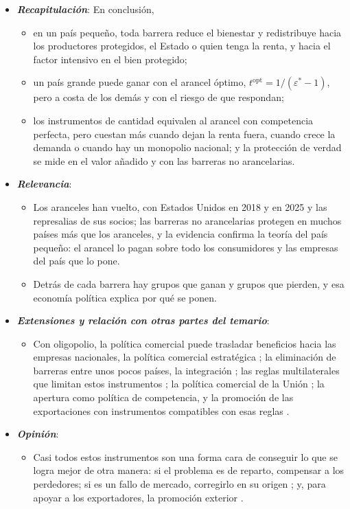 \documentclass[11pt]{article}
\begin{document}
\begin{itemize}
\item \textbf{\emph{Recapitulación}}: En conclusión,
  \begin{itemize}
  \item en un país pequeño, toda barrera reduce el bienestar y redistribuye hacia los productores protegidos, el Estado o quien tenga la renta, y hacia el factor intensivo en el bien protegido;
  \item un país grande puede ganar con el arancel óptimo, $t^{\mathrm{opt}}=1/(\varepsilon^*-1)$, pero a costa de los demás y con el riesgo de que respondan;
  \item los instrumentos de cantidad equivalen al arancel con competencia perfecta, pero cuestan más cuando dejan la renta fuera, cuando crece la demanda o cuando hay un monopolio nacional; y la protección de verdad se mide en el valor añadido y con las barreras no arancelarias.
  \end{itemize}
\item \textbf{\emph{Relevancia}}:
  \begin{itemize}
  \item Los aranceles han vuelto, con Estados Unidos en 2018 y en 2025 y las represalias de sus socios; las barreras no arancelarias protegen en muchos países más que los aranceles, y la evidencia confirma la teoría del país pequeño: el arancel lo pagan sobre todo los consumidores y las empresas del país que lo pone.

  \item Detrás de cada barrera hay grupos que ganan y grupos que pierden, y esa economía política explica por qué se ponen.
  \end{itemize}
\item \textbf{\emph{Extensiones y relación con otras partes del temario}}:
  \begin{itemize}
  \item Con oligopolio, la política comercial puede trasladar beneficios hacia las empresas nacionales, la política comercial estratégica ; la eliminación de barreras entre unos pocos países, la integración ; las reglas multilaterales que limitan estos instrumentos ; la política comercial de la Unión ; la apertura como política de competencia\nocite{CNMC2017Beneficios}, y la promoción de las exportaciones con instrumentos compatibles con esas reglas .
  \end{itemize}
\item \textbf{\emph{Opinión}}:
  \begin{itemize}
  \item Casi todos estos instrumentos son una forma cara de conseguir lo que se logra mejor de otra manera: si el problema es de reparto, compensar a los perdedores; si es un fallo de mercado, corregirlo en su origen ; y, para apoyar a los exportadores, la promoción exterior .


\end{itemize}
\end{itemize}
\end{document}
